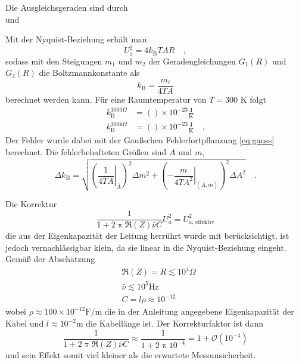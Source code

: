 		Die Ausgleichsgeraden sind durch
		\begin{equation}
			
		\end{equation}
		und
		\begin{equation}
			
		\end{equation}

		Mit der Nyquist-Beziehung erhält man
		\begin{equation}
			U_\text{a}^2 =4k_\text{B}T A R \quad ,
		\end{equation}
		sodass mit den Steigungen $m_1$ und $m_2$ der Geradengleichungen $G_1(R)$ und $G_2(R)$
		die Boltzmannkonstante als
		\begin{equation}
		k_\text{B}=\frac{m_i}{4 T A}
		\end{equation}
		berechnet werden kann. Für eine Raumtemperatur von $T= 300$ K folgt
		\begin{align}
          k_\text{B}^{1000\Omega}			&=  ()\times 10^{-23}\frac{\text{J}}
																			{\text{K}}  \\
                                                                            k_\text{B}^{100\text{k}\Omega}	&=  ()\times 10^{-23}\frac{\text{J}}
																			{\text{K}} \quad .
		\end{align}
		Der Fehler wurde dabei mit der Gaußschen Fehlerfortpflanzung \eqref{eq:gauss}
		berechnet. Die fehlerbehafteten Größen sind $A$ und $m$,
		\begin{equation}
		\Delta k_\text{B}=\sqrt{
		\left(\left. \frac{1}{4 T A} \right|_{\bar{A}}\right)^2 \Delta m^2 
		+		
		\left(\left. -\frac{m}{4 T A^2} \right|_{(\bar{A},\bar{m})}\right)^2 \Delta A^2
		} \quad .
		\end{equation}

		Die Korrektur
		\begin{equation}
		\frac{1}{1+2 \uppi \Re(Z) \bar{\nu} C} U_a^2 = U_{a\text{, effektiv}}^2
		\end{equation}
		die aus der Eigenkapazität der Leitung herrührt wurde mit berücksichtigt, ist
		jedoch vernachlässigbar klein, da
		sie linear in die Nyquist-Beziehung eingeht. Gemäß der Abschätzung
		\begin{align}
		&\Re(Z) = R  \lesssim  10^4 \Omega \\
		&\bar{\nu}  \lesssim 10^5 \text{Hz} \\
		&C = l \rho  \approx 10^{-12}
		\end{align}
		wobei $\rho\approx 100 \times 10^{-12} \text{F}/\text{m}$ die in
		der Anleitung angegebene Eigenkapazität der Kabel
		und $l\approx 10^{-2}$m die Kabellänge ist. Der Korrekturfaktor ist dann
		\begin{equation}
		\frac{1}{1+2 \uppi \Re(Z) \bar{\nu} C} \approx
		\frac{1}{1+2\uppi 10^{-4}}=1+ \mathcal{O}(10^{-4})
		\end{equation}
		und sein Effekt somit viel kleiner als die erwartete Messunsicherheit.

